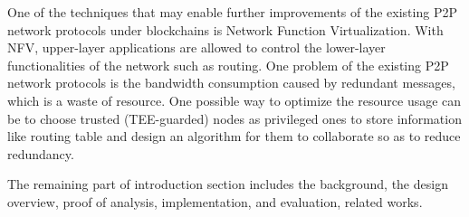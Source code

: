 One of the techniques that may enable further improvements of the existing P2P network protocols under blockchains is Network Function Virtualization. With NFV, upper-layer applications are allowed to control the lower-layer functionalities of the network such as routing. One problem of the existing P2P network protocols is the bandwidth consumption caused by redundant messages, which is a waste of resource. One possible way to optimize the resource usage can be to choose trusted (TEE-guarded) nodes as privileged ones to store information like routing table and design an algorithm for them to collaborate so as to reduce redundancy. 

The remaining part of introduction section includes the background, the design overview, proof of analysis, implementation, and evaluation, related works.